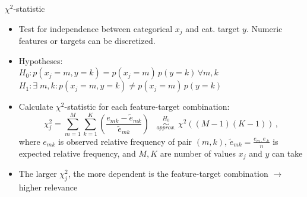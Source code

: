 \documentclass[11pt,compress,t,notes=noshow, xcolor=table]{beamer}
\begin{document}
  \begin{frame2}{$\chi^2$-statistic}
  \begin{itemize}
    \item Test for independence between categorical $x_j$ and cat. target $y$. Numeric features or targets can be discretized.
    \item Hypotheses: \\
    $H_0: p(x_j = m, y = k) = p(x_j = m)\, p(y = k) \,\forall m, k$\\


    $H_1: \exists \; m, k: p(x_j = m, y = k) \neq p(x_j = m)\, p(y = k)$
    \item Calculate $\chi^2$-statistic for each feature-target combination:
      $$ \chi_j^2 = \sum_{m = 1}^{M} \sum_{k=1}^{K} (\frac{e_{mk} - \tilde{e}_{mk}}{\tilde{e}_{mk}}) \;\;\;   \stackrel{H_0}{\underset{approx.}{\sim}} \; \chi^2 ((M-1)(K-1))\,,$$
    where $e_{mk}$ is observed relative frequency of pair $(m,k)$, $\tilde{e}_{mk} = \frac{e_{m \cdot} e_{\cdot k}}{n}$ is expected relative frequency, and $M,K$ are number of values $x_j$ and $y$ can take
    \item The larger $\chi_j^2$, the more dependent is the feature-target combination $\rightarrow$ higher relevance
  \end{itemize}
  \end{frame2}
\end{document}
